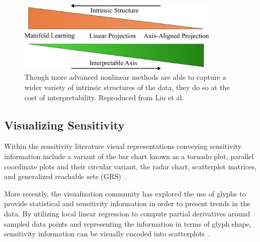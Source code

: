 \begin{figure}[!ht]
  \centering
  \includegraphics[width=0.85\textwidth]{figs/chap3/interpretableAxis}
  \caption[Interpretability of Dimensionality Reduction Techniques]{Though more advanced nonlinear methods are able to capture a wider variety of intrinsic structures of the data, they do so at the cost of interpretability. Reproduced from Liu et al.~\cite{LiuMaljovecWang2015}}
  \label{fig:axisInterpretability}
\end{figure}

\subsection{Visualizing Sensitivity}
\label{sec:SA_visualization}
Within the sensitivity literature visual representations conveying sensitivity information include a variant of the bar chart known as a tornado plot, parallel coordinate plots and their circular variant, the radar chart, scatterplot matrices,  and generalized reachable sets (GRS)~\cite{SaltelliChanScott2000,BushenkovChernykhKamenev1995}.

More recently, the visualization community has explored the use of glyphs to provide statistical and sensitivity information in order to present trends in the data.
%
By utilizing local linear regression to compute partial derivatives around sampled data points and representing the information in terms of glyph shape, sensitivity information can be visually encoded into scatterplots~\cite{CorreaChanMa2009,ChanCorreaMa2010,GuoWardRundensteiner2011,ChanCorreaMa2013}.

